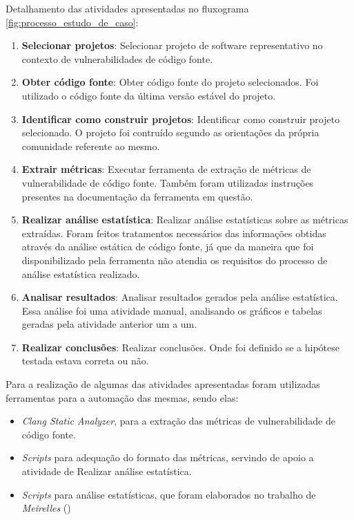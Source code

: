 Detalhamento das atividades apresentadas no fluxograma
\ref{fig:processo_estudo_de_caso}:

\begin{enumerate}\label{desc_processo}
  \item \textbf{Selecionar projetos}: Selecionar projeto de software representativo no contexto de
    vulnerabilidades de código fonte.
  \item \textbf{Obter código fonte}: Obter código fonte do projeto selecionados. Foi utilizado o código fonte
  da última versão estável do projeto.
  \item \textbf{Identificar como construir projetos}: Identificar como construir projeto selecionado. O projeto foi contruído
    segundo as orientações da própria comunidade referente ao mesmo.
  \item \textbf{Extrair métricas}: Executar ferramenta de extração de métricas de vulnerabilidade de código
    fonte. Também foram utilizadas instruções presentes na documentação da
    ferramenta em questão.
  \item \textbf{Realizar análise estatística}: Realizar análise estatísticas sobre as métricas extraídas. Foram feitos
    tratamentos necessários das informações obtidas através da análise estática
    de código fonte, já que da maneira que foi disponibilizado pela ferramenta
    não atendia os requisitos do processo de análise estatística realizado.
  \item \textbf{Analisar resultados}: Analisar resultados gerados pela análise estatística. Essa análise foi uma atividade
    manual, analisando os gráficos e tabelas geradas pela atividade anterior um
    a um.
  \item \textbf{Realizar conclusões}: Realizar conclusões. Onde foi definido se a hipótese testada estava
    correta ou não.
\end{enumerate}

Para a realização de algumas das atividades apresentadas foram utilizadas
ferramentas para a automação das mesmas, sendo elas:

\begin{itemize}
  \item \textit{Clang Static Analyzer}, para a extração das métricas de
    vulnerabilidade de código fonte.
  \item \textit{Scripts} para adequação do formato das métricas, servindo de
    apoio a atividade de Realizar análise estatística.
  \item \textit{Scripts} para análise estatísticas, que foram elaborados no
    trabalho de \emph{Meirelles} (\citeyear{meirelles2013})
\end{itemize}

